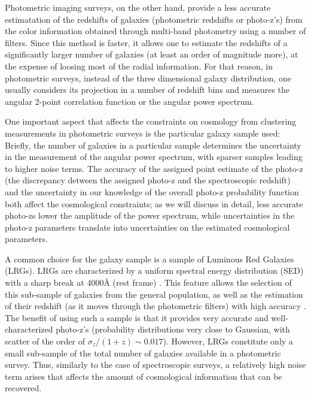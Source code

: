 \documentclass[a4paper,fleqn,usenatbib]{mnras}
\begin{document}
Photometric imaging surveys, on the other hand, provide a less accurate estimatation of the redshifts of galaxies (photometric redshifts or photo-z's) from the color information obtained through multi-band photometry using a number of filters. Since this method is faster, it allows one to estimate the redshifts of a significantly larger number of galaxies (at least an order of magnitude more), at the expense of loosing most of the radial information. For that reason, in photometric surveys, instead of the three dimensional galaxy distribution, one usually considers its projection in a number of redshift bins and measures the angular 2-point correlation function or the angular power spectrum.  

One important aspect that affects the constraints on cosmology from clustering measurements in photometric surveys is the particular galaxy sample used: Briefly, the number of galaxies in a particular sample determines the uncertainty in the measurement of the angular power spectrum, with sparser samples leading to higher noise terms. The accuracy of the assigned point estimate of the photo-z (the discrepancy detween the assigned   photo-z and the spectroscopic redshift) and the uncertainty in our knowledge of the overall photo-z probability function  both affect the cosmological constraints; as we will discuss in detail, less accurate photo-zs lower the amplitude of the power spectrum, while uncertainties in the photo-z parameters translate into uncertainties on the estimated cosmological parameters.

A common choice for the galaxy sample is a sample of Luminous Red Galaxies (LRGs).  LRGs are characterized by a uniform spectral energy distribution (SED)  with a sharp break at 4000{\AA} (rest frame) \citep{Eisenstein2001}. This feature allows the selection of this sub-sample of galaxies from the general population, as well as the estimation of their redshift (as it moves through the photometric filters) with high accuracy \citep{Padmanabhan2005, Rozo2016}. The benefit of using such a sample is that it provides very accurate and well-characterized photo-z's (probability distributions very close to Gaussian, with scatter of the order of $\sigma_{z}/(1 + z) \sim 0.017$). However, LRGs constitute only a small sub-sample of the total number of galaxies available in a photometric survey. Thus, similarly to the case of spectroscopic surveys, a relatively high noise term arises that affects the amount of cosmological information that can be recovered.
\end{document}
